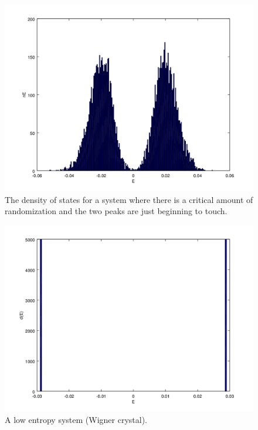 \begin{figure}[htbp]
\begin{center}
\includegraphics[scale=.50]{critDoS.png}
\caption{The density of states for a system where there is a critical amount of randomization and the two peaks are just beginning to touch.}
\label{critDoS}
\end{center}
\end{figure}


\begin{figure}[htbp]
\begin{center}
\includegraphics[scale=.50]{splitDos.png}
\caption{A low entropy system (Wigner crystal).}
\label{crystalDoS}
\end{center}
\end{figure}

